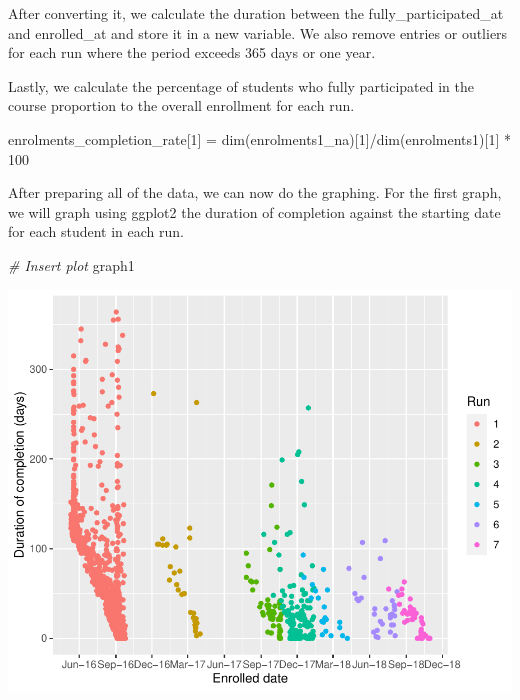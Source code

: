 \documentclass[12pt,]{article}
\newenvironment{Shaded}{\begin{snugshade}}{\end{snugshade}}
\newcommand{\CommentTok}[1]{\textcolor[rgb]{0.56,0.35,0.01}{\textit{#1}}}
\newcommand{\DecValTok}[1]{\textcolor[rgb]{0.00,0.00,0.81}{#1}}
\newcommand{\FunctionTok}[1]{\textcolor[rgb]{0.00,0.00,0.00}{#1}}
\newcommand{\NormalTok}[1]{#1}
\newcommand{\OtherTok}[1]{\textcolor[rgb]{0.56,0.35,0.01}{#1}}
\newcommand{\SpecialCharTok}[1]{\textcolor[rgb]{0.00,0.00,0.00}{#1}}
\begin{document}
After converting it, we calculate the duration between the
fully\_participated\_at and enrolled\_at and store it in a new variable.
We also remove entries or outliers for each run where the period exceeds
365 days or one year.

\begin{Shaded}
\end{Shaded}

Lastly, we calculate the percentage of students who fully participated
in the course proportion to the overall enrollment for each run.

\begin{Shaded}
\begin{Highlighting}[]
\NormalTok{enrolments\_completion\_rate[}\DecValTok{1}\NormalTok{] }\OtherTok{=} 
  \FunctionTok{dim}\NormalTok{(enrolments1\_na)[}\DecValTok{1}\NormalTok{]}\SpecialCharTok{/}\FunctionTok{dim}\NormalTok{(enrolments1)[}\DecValTok{1}\NormalTok{] }\SpecialCharTok{*} \DecValTok{100}
\end{Highlighting}
\end{Shaded}

After preparing all of the data, we can now do the graphing. For the
first graph, we will graph using ggplot2 the duration of completion
against the starting date for each student in each run.

\begin{Shaded}
\begin{Highlighting}[]
\CommentTok{\# Insert plot}
\NormalTok{graph1}
\end{Highlighting}
\end{Shaded}

\begin{center}\includegraphics{report_files/figure-latex/unnamed-chunk-7-1} \end{center}
\end{document}
